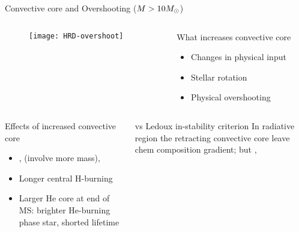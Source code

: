 \begin{frame}{Convective core and Overshooting ($M>10M_{\odot}{}$)}
\begin{columns}[T]\begin{column}{0.5\textwidth}
\begin{figure}[!ht]
\texttt{[image: HRD-overshoot]}\label{fig:HRD-overshoot}
\end{figure}
\end{column}
\begin{column}{0.5\textwidth}
\begin{block}{What increases convective core}
\begin{itemize}
\item Changes in physical input
\item Stellar rotation
\item Physical overshooting
\end{itemize}
\end{block}
\end{column}\end{columns}
\begin{columns}[T]\begin{column}{0.55\textwidth}
\begin{block}{Effects of increased convective core}
\begin{itemize}
\item {}, \xaumenta{\mu} (involve more mass), 
\item Longer central H-burning
\item Larger He core at end of MS: brighter He-burning phase star, shorted lifetime
\end{itemize}
\end{block}
\end{column}
\begin{column}{0.45\textwidth}
\begin{block}{\sch vs Ledoux in-stability criterion}
In radiative region the retracting convective core leave chem composition gradient; but , \xdiminuisce{\kappa}
\end{block}
\end{column}\end{columns}
\end{frame}

